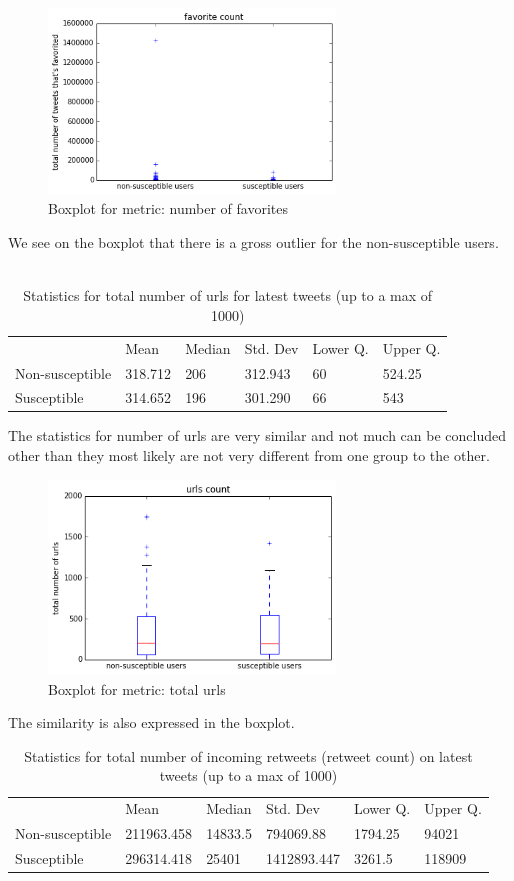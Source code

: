 \documentclass[10pt]{IEEEtran}
\begin{document}
\begin{figure}[H]
  \centering
  \includegraphics[width=3.0in]{favorite_boxplot}
  \caption{Boxplot for metric: number of favorites}
  \label{fig:favorite_boxplot}
\end{figure}
We see on the boxplot that there is a gross outlier for the non-susceptible users.\\\\
\begin{table}[ht!]
\begin{tabular}{llllll}
\textbf{}       & Mean    & Median & Std. Dev & Lower Q. & Upper Q. \\
Non-susceptible & 318.712 & 206    & 312.943  & 60       &  524.25  \\
Susceptible     & 314.652 & 196    & 301.290  & 66       &   543  
\end{tabular}
\caption{Statistics for total number of urls for latest tweets (up to a max of 1000)}
\end{table}
The statistics for number of urls are very similar and not much can be concluded other than they most likely are not very different from one group to the other.
\begin{figure}[H]
  \centering
  \includegraphics[width=3.0in]{total_urls_boxplot}
  \caption{Boxplot for metric: total urls}
  \label{fig:total_urls_boxplot}
\end{figure}
The similarity is also expressed in the boxplot.
\begin{table}[ht!]
\begin{tabular}{llllll}
\textbf{}       & Mean       & Median  & Std. Dev    & Lower Q. & Upper Q. \\
Non-susceptible & 211963.458 & 14833.5 & 794069.88   & 1794.25    & 94021  \\
Susceptible     & 296314.418 & 25401   & 1412893.447 & 3261.5   &  118909 
\end{tabular}
\caption{Statistics for total number of incoming retweets (retweet count) on latest tweets (up to a max of 1000)}
\end{table}
\end{document}
